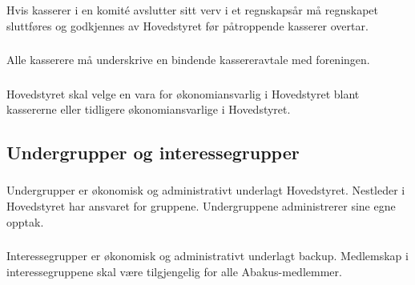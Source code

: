 \subsubsection{}
Hvis kasserer i en komité avslutter sitt verv i et regnskapsår må regnskapet
sluttføres og godkjennes av Hovedstyret før påtroppende kasserer overtar.

\subsubsection{}
Alle kasserere må underskrive en bindende kassereravtale med foreningen.

\subsubsection{}
Hovedstyret skal velge en vara for økonomiansvarlig i Hovedstyret blant kassererne eller tidligere økonomiansvarlige i Hovedstyret.

\subsection{Undergrupper og interessegrupper}

\subsubsection{}
Undergrupper er økonomisk og administrativt underlagt Hovedstyret. Nestleder i
Hovedstyret har ansvaret for gruppene. Undergruppene administrerer sine egne
opptak.

\subsubsection{}
Interessegrupper er økonomisk og administrativt underlagt backup. Medlemskap i
interessegruppene skal være tilgjengelig for alle Abakus-medlemmer.

